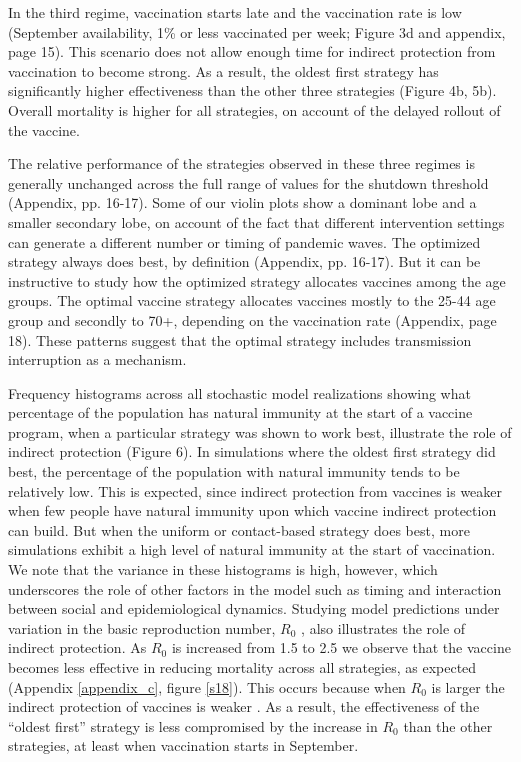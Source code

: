 In the third regime, vaccination starts late and the vaccination rate is low (September availability, 1\% or less vaccinated per week; Figure 3d and appendix, page 15). This scenario does not allow enough time for indirect protection from vaccination to become strong.  As a result, the oldest first strategy has significantly higher effectiveness than the other three strategies (Figure 4b, 5b).  Overall mortality is higher for all strategies, on account of the delayed rollout of the vaccine. 
  
The relative performance of the strategies observed in these three regimes is generally unchanged across the full range of values for the shutdown threshold (Appendix, pp. 16-17).  Some of our violin plots show a dominant lobe and a smaller secondary lobe, on account of the fact that different intervention settings can generate a different number or timing of pandemic waves.  The optimized strategy always does best, by definition (Appendix, pp. 16-17). But it can be instructive to study how the optimized strategy allocates vaccines among the age groups. The optimal vaccine strategy allocates vaccines mostly to the 25-44 age group and secondly to 70+, depending on the vaccination rate (Appendix, page 18). These patterns suggest that the optimal strategy includes transmission interruption as a mechanism.   

Frequency histograms across all stochastic model realizations showing what percentage of the population has natural immunity at the start of a vaccine program, when a particular strategy was shown to work best, illustrate the role of indirect protection (Figure 6). In simulations where the oldest first strategy did best, the percentage of the population with natural immunity tends to be relatively low. This is expected, since indirect protection from vaccines is weaker when few people have natural immunity upon which vaccine indirect protection can build.  But when the uniform or contact-based strategy does best, more simulations exhibit a high level of natural immunity at the start of vaccination.  We note that the variance in these histograms is high, however, which underscores the role of other factors in the model such as timing and interaction between social and epidemiological dynamics. Studying model predictions under variation in the basic reproduction number, $R_0$ \cite{anderson1992infectious}, also illustrates the role of indirect protection. As  $R_0$ is increased from 1.5 to 2.5 we observe that the vaccine becomes less effective in reducing mortality across all strategies, as expected (Appendix \ref{appendix_c}, figure \ref{s18}). This occurs because when $R_0$ is larger the indirect protection of vaccines is weaker \cite{anderson1992infectious}. As a result, the effectiveness of the “oldest first” strategy is less compromised by the increase in $R_0$ than the other strategies, at least when vaccination starts in September. 

